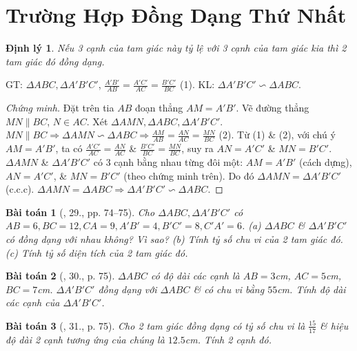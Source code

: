\documentclass{article}
\newtheorem{baitoan}{Bài toán}
\newtheorem{dinhly}{Định lý}
\begin{document}

\section{Trường Hợp Đồng Dạng Thứ Nhất}

\begin{dinhly}
	Nếu 3 cạnh của tam giác này tỷ lệ với 3 cạnh của tam giác kia thì 2 tam giác đó đồng dạng.
\end{dinhly}
GT: $\Delta ABC,\Delta A'B'C'$, $\frac{A'B'}{AB} = \frac{A'C'}{AC} = \frac{B'C'}{BC}$ (1). KL: $\Delta A'B'C'\backsim\Delta ABC$.

\begin{proof}[Chứng minh]
	Đặt trên tia $AB$ đoạn thẳng $AM = A'B'$. Vẽ đường thẳng $MN\parallel BC$, $N\in AC$. Xét $\Delta AMN,\Delta ABC,\Delta A'B'C'$. $MN\parallel BC\Rightarrow\Delta AMN\backsim\Delta ABC\Rightarrow\frac{AM}{AB} = \frac{AN}{AC} = \frac{MN}{BC}$ (2). Từ (1) \& (2), với chú ý $AM = A'B'$, ta có $\frac{A'C'}{AC} = \frac{AN}{AC}$ \& $\frac{B'C'}{BC} = \frac{MN}{BC}$, suy ra $AN = A'C'$ \& $MN = B'C'$. $\Delta AMN$ \& $\Delta A'B'C'$ có 3 cạnh bằng nhau từng đôi một: $AM = A'B'$ (cách dựng), $AN = A'C'$, \& $MN = B'C'$ (theo chứng minh trên). Do đó $\Delta AMN = \Delta A'B'C'$ (c.c.c). $\Delta AMN = \Delta ABC\Rightarrow\Delta A'B'C'\backsim\Delta ABC$.
\end{proof}

\begin{baitoan}[\cite{SGK_Toan_8_tap_2}, 29., pp. 74--75]
	Cho $\Delta ABC,\Delta A'B'C'$ có $AB = 6, BC = 12, CA = 9, A'B' = 4, B'C' = 8, C'A' = 6$. (a) $\Delta ABC$ \& $\Delta A'B'C'$ có đồng dạng với nhau không? Vì sao? (b) Tính tỷ số chu vi của 2 tam giác đó. (c) Tính tỷ số diện tích của 2 tam giác đó.
\end{baitoan}

\begin{baitoan}[\cite{SGK_Toan_8_tap_2}, 30., p. 75]
	$\Delta ABC$ có độ dài các cạnh là $AB = 3$\emph{cm}, $AC = 5$\emph{cm}, $BC = 7$\emph{cm}. $\Delta A'B'C'$ đồng dạng với $\Delta ABC$ \& có chu vi bằng $55$\emph{cm}. Tính độ dài các cạnh của $\Delta A'B'C'$.
\end{baitoan}

\begin{baitoan}[\cite{SGK_Toan_8_tap_2}, 31., p. 75]
	Cho 2 tam giác đồng dạng có tỷ số chu vi là $\frac{15}{17}$ \& hiệu độ dài 2 cạnh tương ứng của chúng là $12.5$\emph{cm}. Tính 2 cạnh đó.
\end{baitoan}
\end{document}
